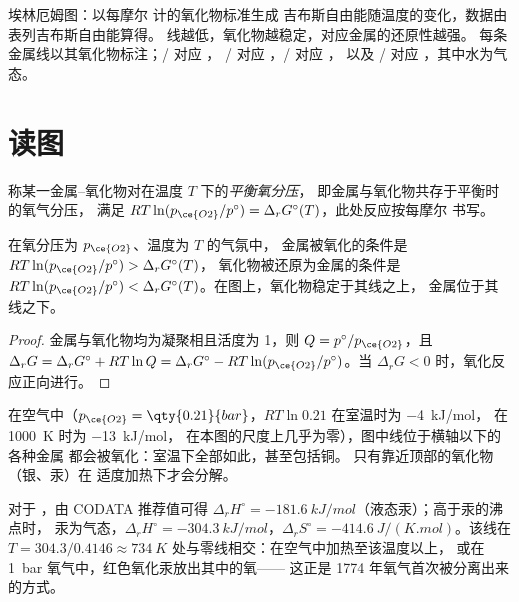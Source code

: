 \begin{omfigure}
{\small 埃林厄姆图：以每摩尔  计的氧化物标准生成
吉布斯自由能随温度的变化，数据由表列吉布斯自由能算得。
线越低，氧化物越稳定，对应金属的还原性越强。
每条金属线以其氧化物标注；/ 对应 ，
/ 对应 ，/ 对应 ，
以及 / 对应 ，其中水为气态。}
\end{omfigure}

\section{读图}

\begin{definition}[平衡氧分压]\label{def:b2:ellingham:oxygen-pressure}
称某一金属–氧化物对在温度 $T$ 下的\emph{平衡氧分压}，
即金属与氧化物共存于平衡时的氧气分压，
满足 $RT\ln(p_{\ce{O2}}/p^\circ) = \Delta_r
G^\circ(T)$，此处反应按每摩尔  书写。
\end{definition}

\begin{theorem}[金属与氧化物的区域]\label{thm:b2:ellingham:domains}
在氧分压为 $p_{\ce{O2}}$、温度为 $T$ 的气氛中，
金属被氧化的条件是 $RT\ln(p_{\ce{O2}}/p^\circ) > \Delta_r G^\circ(T)$，
氧化物被还原为金属的条件是 $RT\ln(p_{\ce{O2}}/p^\circ) < \Delta_r
G^\circ(T)$。在图上，氧化物稳定于其线之上，
金属位于其线之下。
\end{theorem}

\begin{proof}
金属与氧化物均为凝聚相且活度为 1，则 $Q = p^\circ/p_{\ce{O2}}$，且
$\Delta_r G = \Delta_r G^\circ + RT\ln Q = \Delta_r G^\circ - RT\ln(p_{\ce{O2}}/
p^\circ)$。当 $\Delta_r G < 0$ 时，氧化反应正向进行。
\end{proof}

在空气中（$p_{\ce{O2}} = \qty{0.21}{bar}$，$RT\ln 0.21$ 在室温时为 \qty{-4}{kJ/mol}，
在 \qty{1000}{K} 时为 \qty{-13}{kJ/mol}，
在本图的尺度上几乎为零），图中线位于横轴以下的各种金属
都会被氧化：室温下全部如此，甚至包括铜。
只有靠近顶部的氧化物（银、汞）在
适度加热下才会分解。

\begin{example}[汞的氧化物]\label{ex:b2:ellingham:hgo}
对于 ，由 CODATA 推荐值可得 $\Delta_r H^\circ =
\qty{-181.6}{kJ/mol}$（液态汞）；高于汞的沸点时，
汞为气态，$\Delta_r H^\circ = \qty{-304.3}{kJ/mol}$，$\Delta_r
S^\circ = \qty{-414.6}{J/(K.mol)}$。该线在
$T = 304.3/0.4146 \approx \qty{734}{K}$ 处与零线相交：在空气中加热至该温度以上，
或在 \qty{1}{bar} 氧气中，红色氧化汞放出其中的氧——
这正是 1774 年氧气首次被分离出来的方式。
\end{example}


